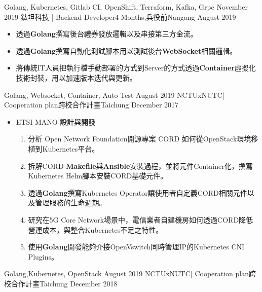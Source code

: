 \begin{experiences}
{\begin{itemize}
                      \end{itemize}
                    }
                    {Golang, Kubernetes, Gitlab CI, OpenShift, Terraform, Kafka, Grpc}
  \emptySeparator
  \experience
    {November 2019} {鈦坦科技 | Backend Developer}{4 Months,兵役前}{Nangang}
    {August 2019}    {
                      \begin{itemize}
                        \item 透過\textbf{Golang}撰寫後台禮券發放邏輯以及串接第三方金流。
                        \item 透過\textbf{Golang}撰寫自動化測試腳本用以測試後台\textbf{WebSocket}相關邏輯。
                        \item 將傳統IT人員把執行檔手動部署的方式到Server的方式透過\textbf{Container}虛擬化技術封裝，用以加速版本迭代與更新。                	
                      \end{itemize}
                    }
                    {Golang, Websocket, Container, Auto Test}
  \emptySeparator
  \experience
    {August  2019}     { NCTUxNUTC| Cooperation plan}{跨校合作計畫}{Taichung}
    {December 2017}    {
                      \begin{itemize}
                        \item ETSI MANO 設計與開發
                        \begin{enumerate}
                        	\item 分析 Open Network Foundation開源專案 CORD 如何從OpenStack環境移植到Kubernetes平台。
                        	\item 拆解CORD \textbf{Makefile}與\textbf{Ansible}安裝過程，並將元件Container化，撰寫Kubernetes Helm腳本安裝CORD基礎元件。
                            \item 透過\textbf{Golang}撰寫Kubernetes Operator讓使用者自定義CORD相關元件以及管理服務的生命週期。
                            \item 研究在5G Core Network場景中，電信業者自建機房如何透過CORD降低營運成本，與整合Kubernetes不足之特性。
                             \item 使用\textbf{Golang}開發能夠介接OpenVswitch同時管理IP的Kubernetes CNI  Plugins。
                        \end{enumerate}
                      \end{itemize}
                    }
                    {Golang,Kubernetes, OpenStack}
\emptySeparator
\experience
    {August  2019}     { NCTUxNUTC| Cooperation plan}{跨校合作計畫}{Taichung}
    {December 2018}    {
}
\end{experiences}
